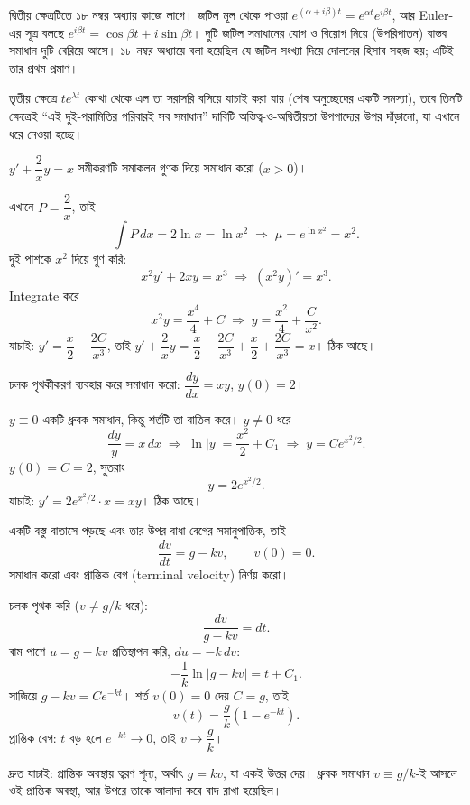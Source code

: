 \documentclass[11pt]{article}
\begin{document}
দ্বিতীয় ক্ষেত্রটিতে ১৮ নম্বর অধ্যায় কাজে লাগে। জটিল মূল থেকে পাওয়া
$e^{(\alpha+i\beta)t} = e^{\alpha t}e^{i\beta t}$, আর Euler-এর সূত্র বলছে
$e^{i\beta t} = \cos\beta t + i\sin\beta t$। দুটি জটিল সমাধানের যোগ ও বিয়োগ
নিয়ে (উপরিপাতন) বাস্তব সমাধান দুটি বেরিয়ে আসে। ১৮ নম্বর অধ্যায়ে বলা
হয়েছিল যে জটিল সংখ্যা দিয়ে দোলনের হিসাব সহজ হয়; এটিই তার প্রথম প্রমাণ।

তৃতীয় ক্ষেত্রে $te^{\lambda t}$ কোথা থেকে এল তা সরাসরি বসিয়ে যাচাই করা যায়
(শেষ অনুচ্ছেদের একটি সমস্যা), তবে তিনটি ক্ষেত্রেই ``এই দুই-পরামিতির পরিবারই
সব সমাধান'' দাবিটি অস্তিত্ব-ও-অদ্বিতীয়তা উপপাদ্যের উপর দাঁড়ানো, যা এখানে
ধরে নেওয়া হচ্ছে।

\begin{example}
$y' + \dfrac{2}{x}y = x$ সমীকরণটি সমাকলন গুণক দিয়ে সমাধান করো ($x > 0$)।
\end{example}

\begin{solbox}
এখানে $P = \dfrac{2}{x}$, তাই
\[
  \int P\,dx = 2\ln x = \ln x^{2}
  \;\Longrightarrow\; \mu = e^{\ln x^{2}} = x^{2} .
\]
দুই পাশকে $x^{2}$ দিয়ে গুণ করি:
\[
  x^{2}y' + 2xy = x^{3}
  \;\Longrightarrow\; \left( x^{2}y \right)' = x^{3} .
\]
Integrate করে
\[
  x^{2}y = \frac{x^{4}}{4} + C
  \;\Longrightarrow\; y = \frac{x^{2}}{4} + \frac{C}{x^{2}} .
\]
যাচাই: $y' = \dfrac{x}{2} - \dfrac{2C}{x^{3}}$, তাই
$y' + \dfrac{2}{x}y = \dfrac{x}{2} - \dfrac{2C}{x^{3}} + \dfrac{x}{2}
+ \dfrac{2C}{x^{3}} = x$। ঠিক আছে।
\end{solbox}

 চলক পৃথকীকরণ ব্যবহার করে সমাধান করো: $\dfrac{dy}{dx} = xy$,
$y(0) = 2$।

\begin{sol}
$y \equiv 0$ একটি ধ্রুবক সমাধান, কিন্তু শর্তটি তা বাতিল করে। $y \neq 0$ ধরে
\[
  \frac{dy}{y} = x\,dx
  \;\Longrightarrow\; \ln|y| = \frac{x^{2}}{2} + C_{1}
  \;\Longrightarrow\; y = Ce^{x^{2}/2} .
\]
$y(0) = C = 2$, সুতরাং
\[
  y = 2e^{x^{2}/2} .
\]
যাচাই: $y' = 2e^{x^{2}/2}\cdot x = xy$। ঠিক আছে।
\end{sol}

 একটি বস্তু বাতাসে পড়ছে এবং তার উপর বাধা বেগের সমানুপাতিক, তাই
\[
  \frac{dv}{dt} = g - kv, \qquad v(0) = 0 .
\]
সমাধান করো এবং প্রান্তিক বেগ (terminal velocity) নির্ণয় করো।

\begin{sol}
চলক পৃথক করি ($v \neq g/k$ ধরে):
\[
  \frac{dv}{g-kv} = dt .
\]
বাম পাশে $u = g-kv$ প্রতিস্থাপন করি, $du = -k\,dv$:
\[
  -\frac{1}{k}\ln|g-kv| = t + C_{1} .
\]
সাজিয়ে $g - kv = Ce^{-kt}$। শর্ত $v(0)=0$ দেয় $C = g$, তাই
\[
  v(t) = \frac{g}{k}\left( 1 - e^{-kt} \right) .
\]
প্রান্তিক বেগ: $t$ বড় হলে $e^{-kt} \to 0$, তাই $v \to \dfrac{g}{k}$।

দ্রুত যাচাই: প্রান্তিক অবস্থায় ত্বরণ শূন্য, অর্থাৎ $g = kv$, যা একই উত্তর
দেয়। ধ্রুবক সমাধান $v \equiv g/k$-ই আসলে ওই প্রান্তিক অবস্থা, আর উপরে তাকে
আলাদা করে বাদ রাখা হয়েছিল।
\end{sol}
\end{document}
